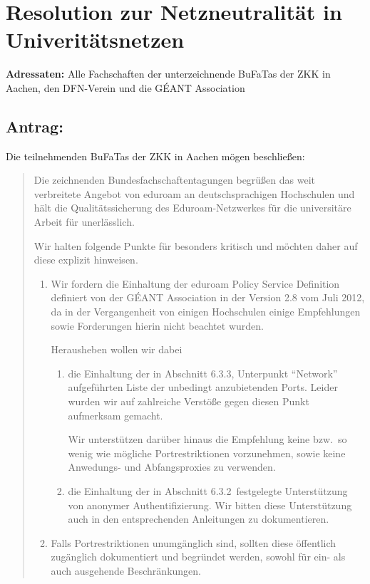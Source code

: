 \documentclass[12pt,oneside]{scrartcl}
\begin{document}
\section*{Resolution zur Netzneutralität in Univeritätsnetzen}

\textbf{Adressaten:} Alle Fachschaften der unterzeichnende BuFaTas der ZKK in
Aachen, den DFN-Verein und die GÉANT Association

\subsection*{Antrag:}
Die teilnehmenden BuFaTas der ZKK in Aachen mögen beschließen:
\begin{quote}
  Die zeichnenden Bundesfachschaftentagungen begrüßen das weit verbreitete
  Angebot von eduroam an deutschsprachigen Hochschulen und hält die
  Qualitätssicherung des Eduroam-Netzwerkes für die universitäre Arbeit für
  unerlässlich.

  Wir halten folgende Punkte für besonders kritisch und möchten daher auf diese
  explizit hinweisen.

  \begin{enumerate}
  \item Wir fordern die Einhaltung der eduroam Policy Service Definition
    definiert von der GÉANT Association in der Version 2.8 vom Juli 2012, da in der
    Vergangenheit von einigen Hochschulen einige Empfehlungen sowie Forderungen
    hierin nicht beachtet wurden.

    Herausheben wollen wir dabei
    \begin{enumerate}
    \item  die Einhaltung der in Abschnitt 6.3.3, Unterpunkt ``Network''
      aufgeführten Liste der unbedingt anzubietenden Ports. Leider wurden wir  auf
      zahlreiche Verstöße gegen diesen Punkt aufmerksam gemacht.

      Wir unterstützen darüber hinaus die Empfehlung keine
      bzw.\ so wenig wie mögliche Portrestriktionen vorzunehmen, sowie keine
      Anwedungs- und Abfangsproxies zu verwenden.

    \item die Einhaltung der in Abschnitt 6.3.2\ festgelegte Unterstützung von
      anonymer Authentifizierung. Wir bitten diese Unterstützung auch in den
      entsprechenden Anleitungen zu dokumentieren.
    \end{enumerate}
  \item Falls Portrestriktionen unumgänglich sind, sollten diese öffentlich
    zugänglich dokumentiert und begründet werden, sowohl für ein- als auch
    ausgehende Beschränkungen.


\end{enumerate}
\end{quote}
\end{document}
